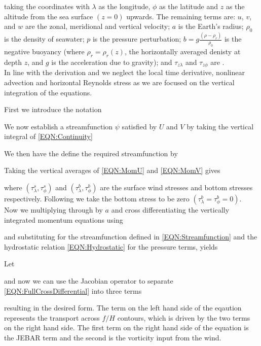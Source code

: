 \documentclass[..\EOYR.tex]{subfiles}
\begin{document}
taking the coordinates with $\lambda$ as the longitude, $\phi$ as the latitude and $z$ as the altitude from the sea surface $\left(z=0\right)$ upwards.
The remaining terms are: $u$, $v$, and $w$ are the zonal, meridional and vertical velocity; $a$ is the Earth's radius; $\rho_0$ is the density of seawater; $p$ is the pressure perturbation; $b=g\frac{\left(\rho-\rho_r\right)}{\rho_0}$ is the negative buoyancy (where $\rho_r=\rho_r(z)$, the horizontally averaged denisty at depth $z$, and $g$ is the acceleration due to gravity); and $\tau_{z\lambda}$ and $\tau_{z\phi}$ are .\\
In line with the \citep{Greatbatch1991} derivation and  we neglect the local time derivative, nonlinear advection and horizontal Reynolds stress as we are focused on the vertical integration of the equations.


First we introduce the notation

We now establish a streamfunction $\psi$ satisfied by $U$ and $V$ by taking the vertical integral of \ref{EQN:Continuity}

We then have the define the required streamfunction by

%
Taking the vertical averages of \ref{EQN:MomU} and \ref{EQN:MomV} gives


where $\left(\tau_\lambda^s, \tau_\phi^s\right)$ and $\left(\tau_\lambda^b, \tau_\phi^b\right)$ are the surface wind stresses and bottom stresses respectively. Following \citep{Greatbatch1991} we take the bottom stress to be zero $\left(\tau_\lambda^b=\tau_\phi^b=0\right)$.\\

Now we multiplying through by $a$ and cross differentiating the vertically integrated momentum equations using

and substituting for the streamfunction defined in \ref{EQN:Streamfunction} and the hydrostatic relation \ref{EQN:Hydrostatic} for the pressure terms, yields


Let

and now we can use the Jacobian operator to separate \ref{EQN:FullCrossDifferential} into three terms

resulting in the desired form. The term on the left hand side of the eqaution represents the transport across $f/H$ contours, which is driven by the two terms on the right hand side. The first term on the right hand side of the equation is the JEBAR term and the second is the vorticity input from the wind.
\end{document}
